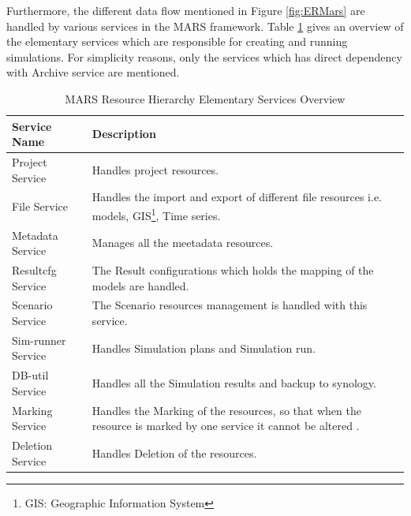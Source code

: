         \newpage
        Furthermore, the different data flow mentioned in Figure \ref{fig:ERMars} are handled by various services in the MARS framework. 
        Table \ref{table:MARS Resource Hierarchy Service Overview} gives an overview of the elementary services which are responsible for 
        creating and running simulations. For simplicity reasons, only the services
        which has direct dependency with Archive service are mentioned.
        \begin{table}[h!]
            \centering
            \begin{tabular}{|p{4cm}|p{10.5cm}|}
                \hline
                    \textbf{Service Name}  & \textbf{Description}\\
                \hline
                    Project Service & 
                    Handles project resources. \\
                \hline
                    File Service
                    & Handles the import and export of different file resources i.e. models, GIS\footnote{\label{footnote:GIS}GIS: Geographic Information System}, 
                    Time series.\\
                \hline
                    Metadata Service  & Manages all the meetadata resources.\\
                \hline
                    Resultcfg Service  & The Result configurations which holds the mapping of the models are handled.\\
                \hline
                    Scenario Service  & The Scenario resources management is handled with this service.\\
                \hline
                    Sim-runner Service  & Handles Simulation plans and Simulation run.\\
                \hline
                    DB-util Service  & Handles all the Simulation results and backup to synology.\\
                \hline
                    Marking Service  & Handles the Marking of the resources, so that when the resource is marked by one service it cannot be altered .\\
                \hline
                    Deletion Service  & Handles Deletion of the resources.\\
                \hline
            \end{tabular}
            \caption{MARS Resource Hierarchy Elementary Services Overview}
            \label{table:MARS Resource Hierarchy Service Overview}     
        \end{table}    